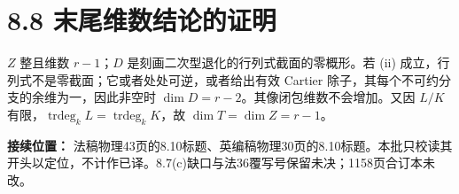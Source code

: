 \documentclass[openany,fontset=fandol]{ctexbook}
\begin{document}
\section*{8.8 末尾维数结论的证明}
$Z$ 整且维数 $r-1$；$D$ 是刻画二次型退化的行列式截面的零概形。若 (ii) 成立，行列式不是零截面；它或者处处可逆，或者给出有效 Cartier 除子，其每个不可约分支的余维为一，因此非空时 $\dim D=r-2$。其像闭包维数不会增加。又因 $L/K$ 有限，$\operatorname{trdeg}_k L=\operatorname{trdeg}_k K$，故 $\dim T=\dim Z=r-1$。

\smallskip
\noindent\textbf{接续位置：} 法稿物理43页的8.10标题、英编稿物理30页的8.10标题。本批只校读其开头以定位，不计作已译。8.7(c)缺口与法36覆写号保留未决；1158页合订本未改。
\end{document}
